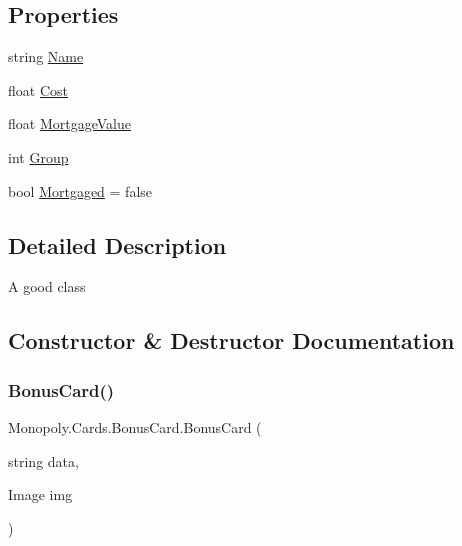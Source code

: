 \subsection*{Properties}
\begin{DoxyCompactItemize}
\item 
string \mbox{\hyperlink{class_monopoly_1_1_cards_1_1_card_ac114f0ec54d1b86154e9c596c3980003}{Name}}
\item 
float \mbox{\hyperlink{class_monopoly_1_1_cards_1_1_card_a67df91aa53596b2ce61ef2c3386ddd7c}{Cost}}
\item 
float \mbox{\hyperlink{class_monopoly_1_1_cards_1_1_card_adb2af81dda38706437f368b088c9b1a6}{Mortgage\+Value}}
\item 
int \mbox{\hyperlink{class_monopoly_1_1_cards_1_1_card_a90d55a4790f3d8afeba0203b70fa2086}{Group}}
\item 
bool \mbox{\hyperlink{class_monopoly_1_1_cards_1_1_card_a5569d582a0692b3a37c81dd2320cc367}{Mortgaged}} = false
\end{DoxyCompactItemize}


\subsection{Detailed Description}
A good class 

\subsection{Constructor \& Destructor Documentation}
\mbox{\label{class_monopoly_1_1_cards_1_1_bonus_card_a444094e643634f0c671c43917f44412f}} 
\subsubsection{\texorpdfstring{Bonus\+Card()}{BonusCard()}}
{\footnotesize\ttfamily Monopoly.\+Cards.\+Bonus\+Card.\+Bonus\+Card (\begin{DoxyParamCaption}\item[{string}]{data,  }\item[{Image}]{img }\end{DoxyParamCaption})\hspace{0.3cm}{\ttfamily [inline]}}

